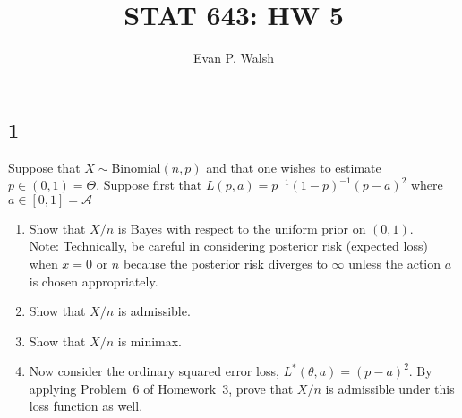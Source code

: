 \documentclass[12pt]{article}
\title{STAT 643: HW 5}
\author{Evan P. Walsh}
\begin{document}
\maketitle


\subsection*{1}
\begin{tcolorbox}
  Suppose that $X \sim$Binomial$(n,p)$ and that one wishes to estimate $p\in(0,1)=\Theta$. Suppose first that $L(p,a)=p^{-1}(1-p)^{-1}(p-a)^2$ where $a\in[0,1]=\mathcal{A}$

  \begin{enumerate}
    \item Show that $X/n$ is Bayes with respect to the uniform prior on $(0,1)$.\\
      Note: Technically, be careful in considering posterior risk (expected loss) when $x=0$ or $n$ because the posterior risk diverges to $\infty$ unless the action $a$ is chosen appropriately.
    \item Show that $X/n$ is admissible.
    \item Show that $X/n$ is minimax.
    \item Now consider the ordinary squared error loss, $L^*(\theta,a)=(p-a)^2$.  By applying Problem~6 of Homework~3,
      prove that
      $X/n$ is admissible under this loss function as well.
  \end{enumerate}
\end{tcolorbox}
\end{document}
